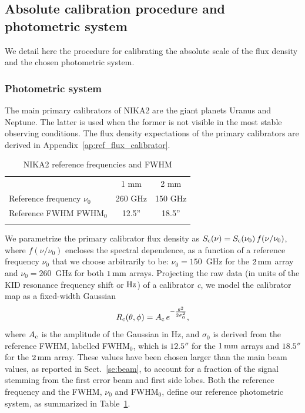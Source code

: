 \subsection{Absolute calibration procedure and photometric system}
\label{se:calibration_method}

We detail here the procedure for calibrating the absolute scale of
the flux density and the chosen photometric system.

\subsubsection{Photometric system}
\label{se:photometric_system}

The main primary calibrators of NIKA2 are the giant planets Uranus and
Neptune. The latter is used when the former is not visible in the most
stable observing conditions. The flux density expectations of the
primary calibrators are derived in Appendix~\ref{ap:ref_flux_calibrator}. 
%
\begin{table}[!htbp]
\caption{NIKA2 reference frequencies and FWHM}
\label{tab:definitions}
\centering     
\begin{tabular}{lcc}
\hline\hline
      \noalign{\smallskip}
      & 1 mm & 2 mm \\
      \noalign{\smallskip}
      \hline
      \noalign{\smallskip}
      Reference frequency $\nu_{0}$ & 260 GHz & 150 GHz \\
      Reference FWHM  FWHM$_{0}$    & 12.5'' & 18.5'' \\
      \noalign{\smallskip}
      \hline
\end{tabular}
\end{table}

We parametrize the primary calibrator flux density as 
$S_{\rm{c}}(\nu) = S_{\rm{c}}(\nu_0)\, f(\nu/\nu_{0})$, where $f(\nu/\nu_{0})$
encloses the spectral dependence, 
as a function of a reference frequency $\nu_{0}$ that we choose
arbitrarily to be: $\nu_{0} = 150$~GHz for the $2\,\rm{mm}$ array and
$\nu_{0}= 260$~GHz for both $1\,\rm{mm}$ arrays. Projecting the raw
data (in units of the KID resonance frequency shift or $\rm Hz$) of a
calibrator {\sl c}, we model the calibrator map as a fixed-width Gaussian
\begin{equation}
  R_{\rm{c}}(\theta, \phi)  = A_{\rm{c}} \, e^{-\frac{\theta^{2}}{2\sigma_{0}^{2}}},
  \label{eq:gaussian_amplitude}
\end{equation}
{\lp where $A_{\rm{c}}$ is the amplitude of the 
Gaussian in Hz,} and $\sigma_{0}$ is derived from the
reference FWHM, labelled FWHM$_{0}$, which is $12.5''$ for the $1\, \rm{mm}$
arrays and $18.5''$ for the $2\,\rm{mm}$ array. These values have
been chosen larger than the main beam values, as reported in
Sect.~\ref{se:beam}, to account for a fraction of the signal stemming from
the first error beam and first side lobes.
Both the reference frequency and the FWHM, $\nu_0$ and FWHM$_{0}$, define
our reference photometric system, as summarized in Table~\ref{tab:definitions}.

